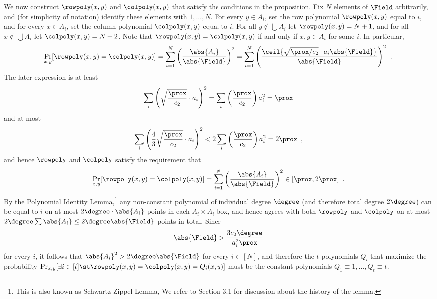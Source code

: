 \documentclass{toc}
\theoremstyle{plain}
\begin{document}
We now construct $\rowpoly(x,y)$ and $\colpoly(x,y)$ that satisfy the conditions in the proposition.
Fix $N$ elements of $\Field$ arbitrarily, and (for simplicity of notation) identify these elements with $1,\dots,N$.
For every $y \in A_i$, set the row polynomial $\rowpoly(x,y)$ equal to $i$, and for every $x \in A_i$,
    set the column polynomial $\colpoly(x,y)$ equal to $i$.
    For all $y \notin \bigcup A_i$ let $\rowpoly(x,y) = N+1$,
    and for all $x \notin \bigcup A_i$ let $\colpoly(x,y) = N+2$.
    Note that $\rowpoly(x,y) = \colpoly(x,y)$ if and only if $x,y \in A_i$ for some $i$.
    In particular,
    \begin{equation*}
        \Pr_{x,y}[\rowpoly(x,y) = \colpoly(x,y)] = \sum_{i=1}^N \left( \frac{\abs{A_i}}{\abs{\Field}} \right)^2
        = \sum_{i=1}^N \left(\frac{\ceil{\sqrt{\prox/c_2} \cdot a_i \abs{\Field}}}{\abs{\Field}} \right)^2
        \enspace.
    \end{equation*}
    The later expression is at least
    \[
      \sum_{i} \left(\sqrt{\frac{\prox}{c_2}} \cdot a_i\right)^2 = \sum_{i} \left(\frac{\prox}{c_2}\right) a_i^2 = \prox
    \]
    and at most
    \[
      \sum_{i} \left(\frac{4}{3} \sqrt{\frac{\prox}{c_2}} \cdot a_i\right)^2  < 2\sum_{i} \left(\frac{\prox}{c_2}\right) a_i^2  = 2\prox\enspace,
      \]
    and hence $\rowpoly$ and $\colpoly$ satisfy the requirement that
    \begin{equation*}
        \Pr_{x,y}[\rowpoly(x,y) = \colpoly(x,y)] = \sum_{i=1}^N \left( \frac{\abs{A_i}}{\abs{\Field}} \right)^2
        \in [\prox, 2\prox]
        \enspace.
    \end{equation*}
    By the %
%
%
%
%
%
%
%
%
    Polynomial Identity Lemma,\footnote{This is also known as Schwartz-Zippel Lemma,                %
      We refer to \cite{arvind} Section 3.1 for discussion about the history of the lemma.}           %
    any non-constant polynomial of individual degree $\degree$ (and therefore total degree $2 \degree$) can be equal to $i$
    on at most $2\degree \cdot \abs{A_i}$ points in each $A_i \times A_i$ box, and hence
    agrees with both $\rowpoly$ and $\colpoly$ on at most $2\degree \sum \abs{A_i} \leq 2\degree \abs{\Field}$
    points in total. Since
    \[
      \abs{\Field} > \frac{3 c_2 \degree}{a_i^2\prox}
    \]
    for every $i$, it follows that $\abs{A_i}^2 > 2\degree \abs{\Field}$ for every $i \in [N]$,
    and therefore the $t$ polynomials $Q_i$ that maximize the probability
    $\Pr_{x,y}[\exists i \in [t] \st \rowpoly(x,y) = \colpoly(x,y) = Q_i(x,y)]$
   must be the constant polynomials $Q_1 \equiv 1,\dots,Q_t \equiv t$.
\end{document}
